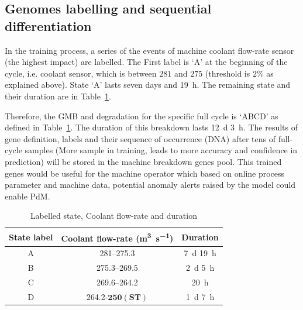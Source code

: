\documentclass[conference]{IEEEtran}
\begin{document}
\subsection{Genomes labelling and sequential differentiation }
\label{subsec:Genome_labelling}
In the training process, a series of the events of machine coolant flow-rate sensor (the highest impact) are labelled. The First label is `A' at the beginning of the cycle, i.e. coolant sensor, which is between $281$ and $275$ (threshold is $2\%$ as explained above). State `A' lasts seven days and \SI{19}{\hour}. The remaining state and their duration are in Table~\ref{tab:II}.

Therefore, the GMB and degradation for the specific full cycle is `ABCD' as defined in Table~\ref{tab:II}. The duration of this breakdown lasts \SI{12}{\day} \SI{3}{\hour}. The results of gene definition, labels and their sequence of occurrence (DNA) after tens of full-cycle samples (More sample in training, leads to more accuracy and confidence in prediction) will be stored in the machine breakdown genes pool. This trained genes would be useful for the machine operator which based on online process parameter and machine data, potential anomaly alerts raised by the model could enable PdM.
\begin{table}[tbp]
    \caption{Labelled state, Coolant flow-rate and duration}
    \begin{center}
        \begin{tabular}{|c|c|c|}
            \hline
            \textbf{State label}& \textbf{Coolant flow-rate (\si{\cubic\metre\per\second})}  & \textbf{Duration} \\
            \hline
            A & \numrange[range-phrase = -]{281}{275.3} & \SI{7}{\day} \SI{19}{\hour}  \\
            \hline
            B & \numrange[range-phrase = -]{275.3}{269.5} & \SI{2}{\day} \SI{5}{\hour} \\
            \hline
            C & \numrange[range-phrase = -]{269.6}{264.2} & \SI{20}{\hour} \\
            \hline
            D & \num{264.2}-\underline{$\mathbf{250 (ST)}$} & \SI{1}{\day} \SI{7}{\hour} \\
            \hline
        \end{tabular}
        \label{tab:II}
    \end{center}
\end{table}
\end{document}
